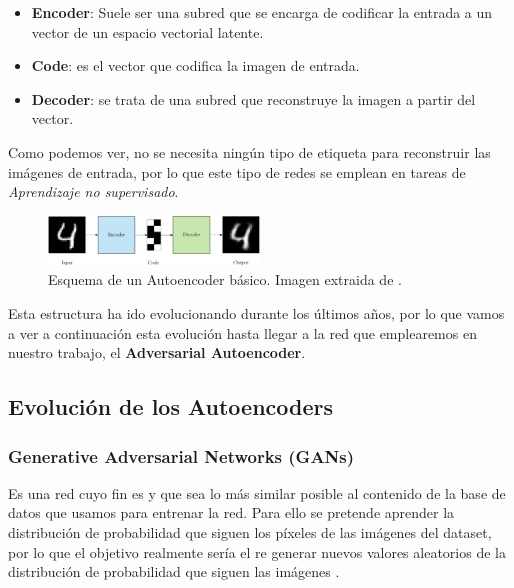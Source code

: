         \begin{itemize}
            \item \textbf{Encoder}: Suele ser una subred que se encarga de codificar la entrada a un vector de un espacio vectorial latente. 
            \item \textbf{Code}: es el vector que codifica la imagen de entrada. 
            \item \textbf{Decoder}: se trata de una subred que reconstruye la imagen a partir del vector.
        \end{itemize}

        \noindent Como podemos ver, no se necesita ningún tipo de etiqueta para reconstruir las imágenes de entrada, por lo que este tipo de redes se emplean en tareas de \textit{Aprendizaje no supervisado}.

        \begin{figure}[!h]
            \centering
            \includegraphics[width=0.5\textwidth]{img/Autoencoder.png}
            \caption{Esquema de un Autoencoder básico. Imagen extraida de \cite{autoencoders2017}.}
            \label{fig:Autoencoder}
        \end{figure}

        \medskip 

        \noindent Esta estructura ha ido evolucionando durante los últimos años, por lo que vamos a ver a continuación esta evolución hasta llegar a la red que emplearemos en nuestro trabajo, el \textbf{Adversarial Autoencoder}.

    \subsection{Evolución de los Autoencoders}
        \subsubsection{Generative Adversarial Networks (GANs)}
            \noindent Es una red cuyo fin es  y que sea lo más similar posible al contenido de la base de datos que usamos para entrenar la red. Para ello se pretende aprender la distribución de probabilidad que siguen los píxeles de las imágenes del dataset, por lo que el objetivo realmente sería el re generar nuevos valores aleatorios de la distribución de probabilidad que siguen las imágenes \cite{GAN}. 

